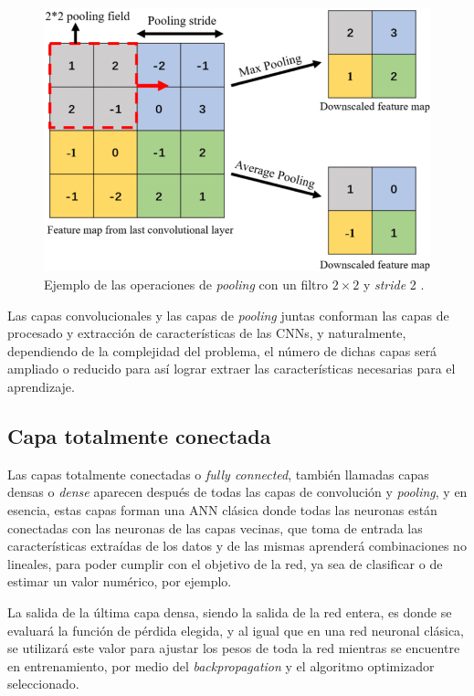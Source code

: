 \begin{figure}[h]
    \centering
    \includegraphics[width=\linewidth]{imagenes/theory/poolingExample.png}
    \caption[Ejemplo del operador de pooling]{Ejemplo de las operaciones de \textit{pooling} con un filtro $2\times2$ y \textit{stride} 2 \cite{pooling}.}
    \label{fig:poolingExample}
\end{figure}

Las capas convolucionales y las capas de \textit{pooling} juntas conforman las capas de procesado y extracción de características de las CNNs, y naturalmente, dependiendo de la complejidad del problema, el número de dichas capas será ampliado o reducido para así lograr extraer las características necesarias para el aprendizaje.

\subsection{Capa totalmente conectada}
Las capas totalmente conectadas o \textit{fully connected}, también llamadas capas densas o \textit{dense} aparecen después de todas las capas de convolución y \textit{pooling}, y en esencia, estas capas forman una ANN clásica donde todas las neuronas están conectadas con las neuronas de las capas vecinas, que toma de entrada las características extraídas de los datos y de las mismas aprenderá combinaciones no lineales, para poder cumplir con el objetivo de la red, ya sea de clasificar o de estimar un valor numérico, por ejemplo.

La salida de la última capa densa, siendo la salida de la red entera, es donde se evaluará la función de pérdida elegida, y al igual que en una red neuronal clásica, se utilizará este valor para ajustar los pesos de toda la red mientras se encuentre en entrenamiento, por medio del \textit{backpropagation} y el algoritmo optimizador seleccionado.


